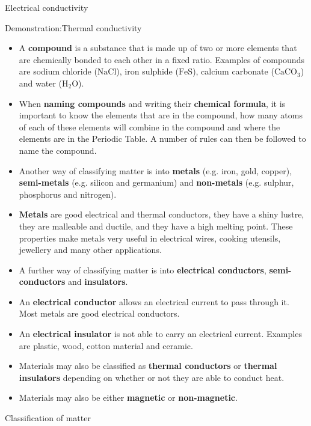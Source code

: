 \begin{iexperiment}{Electrical conductivity}
\begin{gexperiment}{Demonstration:Thermal conductivity}
\begin{itemize}[noitemsep]
\label{m38706*uid124}\item A \textbf{compound} is a substance that is made up of two or more elements that are chemically bonded to each other in a fixed ratio. Examples of compounds are sodium chloride ($\mathrm{NaCl}$), iron sulphide ($\mathrm{FeS}$), calcium carbonate (${\mathrm{CaCO}}_{3}$) and water (${\mathrm{H}}_{2}\mathrm{O}$).
\label{m38706*uid125}\item When \textbf{naming compounds} and writing their \textbf{chemical formula}, it is important to know the elements that are in the compound, how many atoms of each of these elements will combine in the compound and where the elements are in the Periodic Table. A number of rules can then be followed to name the compound.
\label{m38706*uid126}\item Another way of classifying matter is into \textbf{metals} (e.g. iron, gold, copper), \textbf{semi-metals} (e.g. silicon and germanium) and \textbf{non-metals} (e.g. sulphur, phosphorus and nitrogen).
\label{m38706*uid127}\item \textbf{Metals} are good electrical and thermal conductors, they have a shiny lustre, they are malleable and ductile, and they have a high melting point. These properties make metals very useful in electrical wires, cooking utensils, jewellery and many other applications.
\label{m38706*uid128}\item A further way of classifying matter is into \textbf{electrical conductors}, \textbf{semi-conductors} and \textbf{insulators}.
\label{m38706*uid129}\item An \textbf{electrical conductor} allows an electrical current to pass through it. Most metals are good electrical conductors.
\label{m38706*uid130}\item An \textbf{electrical insulator} is not able to carry an electrical current. Examples are plastic, wood, cotton material and ceramic.
\label{m38706*uid131}\item Materials may also be classified as \textbf{thermal conductors} or \textbf{thermal insulators} depending on whether or not they are able to conduct heat.
\label{m38706*uid132}\item Materials may also be either \textbf{magnetic} or \textbf{non-magnetic}.
\end{itemize}
\label{m38706*secfhsst!!!underscore!!!id672}
            \begin{eocexercises}{Classification of matter }{
            \nopagebreak
      \label{m38706*id67920}\begin{enumerate}[noitemsep, label=\textbf{\arabic*}. ] 

\end{enumerate}}
\end{eocexercises}
\end{gexperiment}
\end{iexperiment}
